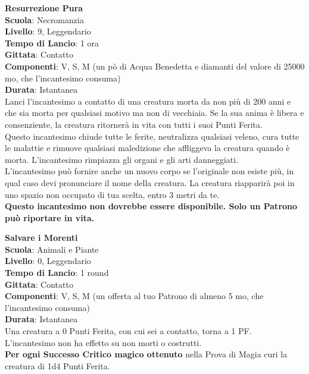 \begin{multicols}{2}
\medskip\textbf{Resurrezione Pura}\\
\textbf{Scuola}: Necromanzia\\
\textbf{Livello}: 9, Leggendario\\
\textbf{Tempo di Lancio}: 1 ora\\
\textbf{Gittata}: Contatto\\
\textbf{Componenti}: V, S, M (un pò di Acqua Benedetta e diamanti del valore di 25000 mo, che l'incantesimo consuma)\\
\textbf{Durata}: Istantanea\\
Lanci l'incantesimo a contatto di una creatura morta da non più di 200 anni e che sia morta per qualsiasi motivo ma non di vecchiaia. Se la sua anima è libera e consenziente, la creatura ritornerà in vita con tutti i suoi Punti Ferita. \\
Questo incantesimo chiude tutte le ferite, neutralizza qualsiasi veleno, cura tutte le malattie e rimuove qualsiasi maledizione che affliggeva la creatura quando è morta. L'incantesimo rimpiazza gli organi e gli arti danneggiati.\\
L'incantesimo può fornire anche un nuovo corpo se l'originale non esiste più, in qual caso devi pronunciare il nome della creatura. La creatura riapparirà poi in uno spazio non occupato di tua scelta, entro 3 metri da te. \\
\textbf{Questo incantesimo non dovrebbe essere disponibile. Solo un Patrono può riportare in vita.}

\medskip\textbf{Salvare i Morenti}\\
\textbf{Scuola}: Animali e Piante\\
\textbf{Livello}: 0, Leggendario\\
\textbf{Tempo di Lancio}: 1 round\\
\textbf{Gittata}: Contatto\\
\textbf{Componenti}: V, S, M (un offerta al tuo Patrono di almeno 5 mo, che l'incantesimo consuma)\\
\textbf{Durata}: Istantanea\\
Una creatura a 0 Punti Ferita, con cui sei a contatto, torna a 1 PF. L'incantesimo non ha effetto su non morti o costrutti.\\
\textbf{Per ogni Successo Critico magico ottenuto} nella Prova di Magia curi la creatura di 1d4 Punti Ferita.


\end{multicols}
